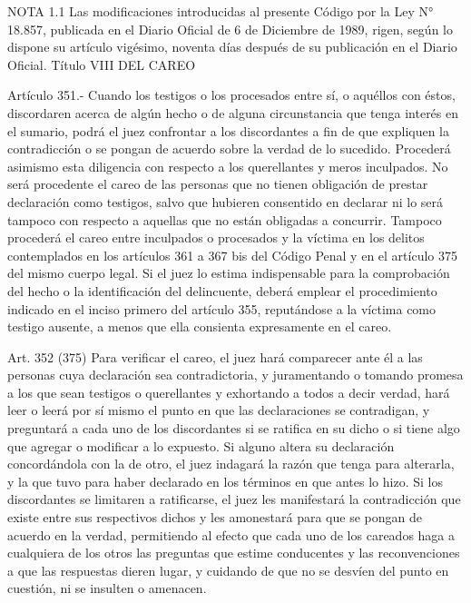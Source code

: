 NOTA 1.1
    Las modificaciones introducidas al presente Código por la Ley N° 18.857, publicada en el Diario Oficial de 6 de Diciembre de 1989, rigen, según lo dispone su artículo vigésimo, noventa días después de su publicación en el Diario Oficial.
    Título VIII
    DEL CAREO

    Artículo 351.- Cuando los testigos o los procesados entre sí, o aquéllos con éstos, discordaren acerca de algún hecho o de alguna circunstancia que tenga interés en el sumario, podrá el juez confrontar a los discordantes a fin de que expliquen la contradicción o se pongan de acuerdo sobre la verdad de lo sucedido.
Procederá asimismo esta diligencia con respecto a los querellantes y meros inculpados.
    No será procedente el careo de las personas que no tienen obligación de prestar declaración como testigos, salvo que hubieren consentido en declarar ni lo será tampoco con respecto a aquellas que no están obligadas a concurrir.
    Tampoco procederá el careo entre inculpados o procesados y la víctima en los delitos contemplados en los artículos 361 a 367 bis del Código Penal y en el artículo 375 del mismo cuerpo legal. Si el juez lo estima indispensable para la comprobación del hecho o la identificación del delincuente, deberá emplear el procedimiento indicado en el inciso primero del artículo 355, reputándose a la víctima como testigo ausente, a menos que ella consienta expresamente en el careo.

    Art. 352 (375) Para verificar el careo, el juez hará comparecer ante él a las personas cuya declaración sea contradictoria, y juramentando o tomando promesa a los que sean testigos o querellantes y exhortando a todos a decir verdad, hará leer o leerá por sí mismo el punto en que las declaraciones se contradigan, y preguntará a cada uno de los discordantes si se ratifica en su dicho o si tiene algo que agregar o modificar a lo expuesto.
    Si alguno altera su declaración concordándola con la de otro, el juez indagará la razón que tenga para alterarla, y la que tuvo para haber declarado en los términos en que antes lo hizo.
    Si los discordantes se limitaren a ratificarse, el juez les manifestará la contradicción que existe entre sus respectivos dichos y les amonestará para que se pongan de acuerdo en la verdad, permitiendo al efecto que cada uno de los careados haga a cualquiera de los otros las preguntas que estime conducentes y las reconvenciones a que las respuestas dieren lugar, y cuidando de que no se desvíen del punto en cuestión, ni se insulten o amenacen.

